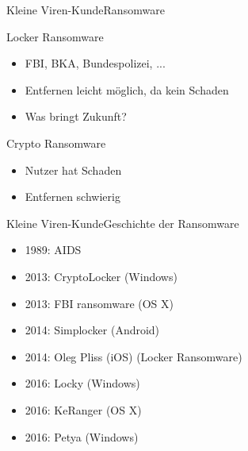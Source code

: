 \documentclass[10pt]{beamer}
\begin{document}
\begin{frame}{Kleine Viren-Kunde}{Ransomware}
	\begin{block}{Locker Ransomware}
		\begin{itemize}
			\item FBI, BKA, Bundespolizei, ...
			\item Entfernen leicht möglich, da kein Schaden
			\item Was bringt Zukunft?
	   	\end{itemize}
	\end{block}
 	\begin{block}{Crypto Ransomware}
	  	\begin{itemize}
			\item Nutzer hat Schaden
			\item Entfernen schwierig
	   	\end{itemize}
  	\end{block}

\end{frame}


\begin{frame}{Kleine Viren-Kunde}{Geschichte der Ransomware}
	\begin{itemize}
		\item 1989: AIDS
		\item 2013: CryptoLocker (Windows)
		\item 2013: FBI ransomware (OS X)
		\item 2014: Simplocker (Android)
		\item 2014: Oleg Pliss (iOS) (Locker Ransomware)
		\item 2016: Locky (Windows)
		\item 2016: KeRanger (OS X)
		\item 2016: Petya (Windows)
	\end{itemize}
\end{frame}
\end{document}
